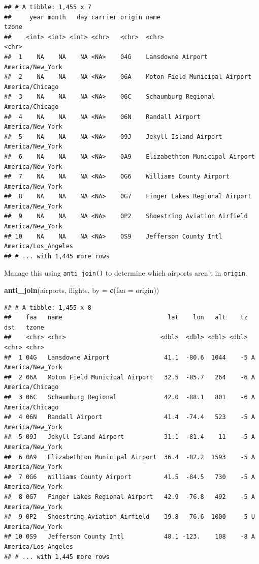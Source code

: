 \documentclass[
]{article}
\newenvironment{Shaded}{\begin{snugshade}}{\end{snugshade}}
\newcommand{\DataTypeTok}[1]{\textcolor[rgb]{0.13,0.29,0.53}{#1}}
\newcommand{\KeywordTok}[1]{\textcolor[rgb]{0.13,0.29,0.53}{\textbf{#1}}}
\newcommand{\NormalTok}[1]{#1}
\newcommand{\StringTok}[1]{\textcolor[rgb]{0.31,0.60,0.02}{#1}}
\begin{document}
\begin{verbatim}
## # A tibble: 1,455 x 7
##     year month   day carrier origin name                           tzone              
##    <int> <int> <int> <chr>   <chr>  <chr>                          <chr>              
##  1    NA    NA    NA <NA>    04G    Lansdowne Airport              America/New_York   
##  2    NA    NA    NA <NA>    06A    Moton Field Municipal Airport  America/Chicago    
##  3    NA    NA    NA <NA>    06C    Schaumburg Regional            America/Chicago    
##  4    NA    NA    NA <NA>    06N    Randall Airport                America/New_York   
##  5    NA    NA    NA <NA>    09J    Jekyll Island Airport          America/New_York   
##  6    NA    NA    NA <NA>    0A9    Elizabethton Municipal Airport America/New_York   
##  7    NA    NA    NA <NA>    0G6    Williams County Airport        America/New_York   
##  8    NA    NA    NA <NA>    0G7    Finger Lakes Regional Airport  America/New_York   
##  9    NA    NA    NA <NA>    0P2    Shoestring Aviation Airfield   America/New_York   
## 10    NA    NA    NA <NA>    0S9    Jefferson County Intl          America/Los_Angeles
## # ... with 1,445 more rows
\end{verbatim}

Manage this using \texttt{anti\_join()} to determine which airports aren't in \texttt{origin}.

\begin{Shaded}
\begin{Highlighting}[]
\KeywordTok{anti\_join}\NormalTok{(airports, flights, }\DataTypeTok{by =} \KeywordTok{c}\NormalTok{(}\StringTok{\textquotesingle{}faa\textquotesingle{}}\NormalTok{ =}\StringTok{ \textquotesingle{}origin\textquotesingle{}}\NormalTok{))}
\end{Highlighting}
\end{Shaded}

\begin{verbatim}
## # A tibble: 1,455 x 8
##    faa   name                             lat    lon   alt    tz dst   tzone              
##    <chr> <chr>                          <dbl>  <dbl> <dbl> <dbl> <chr> <chr>              
##  1 04G   Lansdowne Airport               41.1  -80.6  1044    -5 A     America/New_York   
##  2 06A   Moton Field Municipal Airport   32.5  -85.7   264    -6 A     America/Chicago    
##  3 06C   Schaumburg Regional             42.0  -88.1   801    -6 A     America/Chicago    
##  4 06N   Randall Airport                 41.4  -74.4   523    -5 A     America/New_York   
##  5 09J   Jekyll Island Airport           31.1  -81.4    11    -5 A     America/New_York   
##  6 0A9   Elizabethton Municipal Airport  36.4  -82.2  1593    -5 A     America/New_York   
##  7 0G6   Williams County Airport         41.5  -84.5   730    -5 A     America/New_York   
##  8 0G7   Finger Lakes Regional Airport   42.9  -76.8   492    -5 A     America/New_York   
##  9 0P2   Shoestring Aviation Airfield    39.8  -76.6  1000    -5 U     America/New_York   
## 10 0S9   Jefferson County Intl           48.1 -123.    108    -8 A     America/Los_Angeles
## # ... with 1,445 more rows
\end{verbatim}
\end{document}

